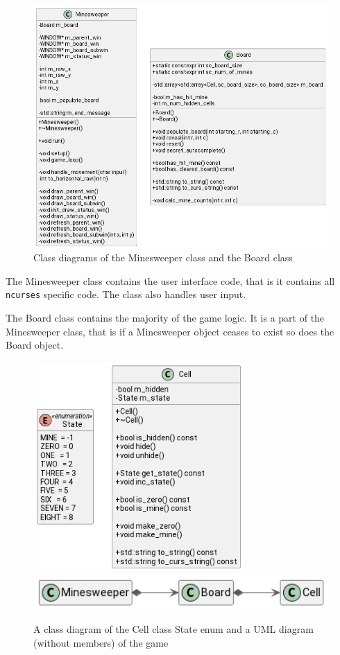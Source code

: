 \documentclass[12pt]{article}
\begin{document}
\begin{figure}[H]
    \centering
    \includegraphics[width=12cm]{minesweeper-uml/minesweeper-and-board.png}
    \caption{Class diagrams of the Minesweeper class and the Board class}
\end{figure}

The Minesweeper class contains the user interface code, that
is it contains all \texttt{ncurses} specific code. The class
also handles user input.

The Board class contains the majority of the game logic. It is a
part of the Minesweeper class, that is if a Minesweeper object
ceases to exist so does the Board object.

\begin{figure}[H]
    \centering
    \includegraphics[height=8cm]{minesweeper-uml/cell.png}
    \includegraphics[width=12cm]{minesweeper-uml/relations.png}
    \caption{A class diagram of the Cell class State enum and a
    UML diagram (without members) of the game}
\end{figure}
\end{document}
